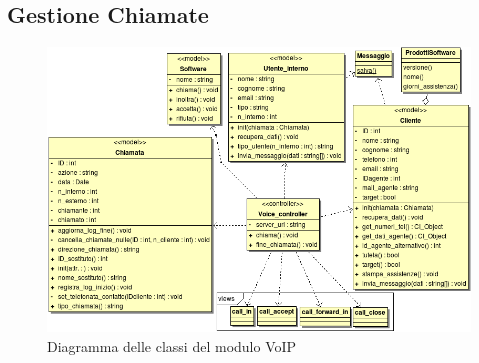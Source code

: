 \subsection{Gestione Chiamate}
\begin{figure}[!ht]
\centering
  \includegraphics[scale=0.7]{./images/VoIPMVC.png}
\caption{Diagramma delle classi del modulo VoIP}
\label{voip}
\end{figure}

